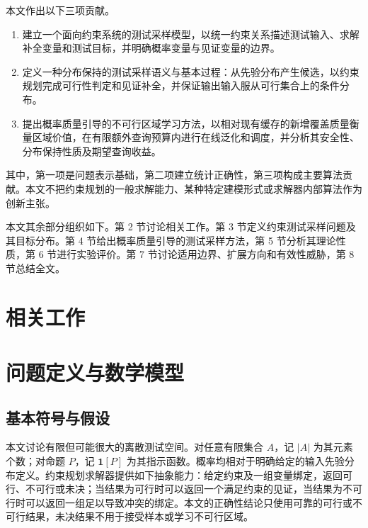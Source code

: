 \documentclass[UTF8, fontset=none, a4paper, 12pt]{ctexart}
\begin{document}
本文作出以下三项贡献。

\begin{enumerate}
  \item 建立一个面向约束系统的测试采样模型，以统一约束关系描述测试输入、求解补全变量和测试目标，并明确概率变量与见证变量的边界。
  \item 定义一种分布保持的测试采样语义与基本过程：从先验分布产生候选，以约束规划完成可行性判定和见证补全，并保证输出输入服从可行集合上的条件分布。
  \item 提出概率质量引导的不可行区域学习方法，以相对现有缓存的新增覆盖质量衡量区域价值，在有限额外查询预算内进行在线泛化和调度，并分析其安全性、分布保持性质及期望查询收益。
\end{enumerate}

其中，第一项是问题表示基础，第二项建立统计正确性，第三项构成主要算法贡献。本文不把约束规划的一般求解能力、某种特定建模形式或求解器内部算法作为创新主张。

本文其余部分组织如下。第 2 节讨论相关工作。第 3 节定义约束测试采样问题及其目标分布。第 4 节给出概率质量引导的测试采样方法，第 5 节分析其理论性质，第 6 节进行实验评价。第 7 节讨论适用边界、扩展方向和有效性威胁，第 8 节总结全文。

\section{相关工作}


\section{问题定义与数学模型}

\subsection{基本符号与假设}

本文讨论有限但可能很大的离散测试空间。对任意有限集合 $A$，记 $|A|$ 为其元素个数；对命题 $P$，记 $\mathbf{1}[P]$ 为其指示函数。概率均相对于明确给定的输入先验分布定义。约束规划求解器提供如下抽象能力：给定约束及一组变量绑定，返回可行、不可行或未决；当结果为可行时可以返回一个满足约束的见证，当结果为不可行时可以返回一组足以导致冲突的绑定。本文的正确性结论只使用可靠的可行或不可行结果，未决结果不用于接受样本或学习不可行区域。
\end{document}
